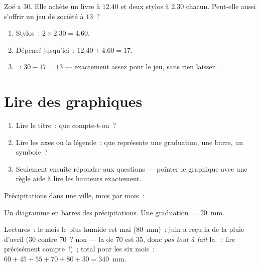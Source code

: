 \begin{example}\label{ex:g5:data:budget}
Zoé a $30$. Elle achète un livre à $12.40$ et deux stylos à
$2.30$ chacun. Peut-elle aussi s'offrir un jeu de société à
$13$~?
\begin{enumerate}
  \item Stylos~: $2 \times 2.30 = 4.60$.
  \item Dépensé jusqu'ici~: $12.40 + 4.60 = 17$.
  \item {}~: $30 - 17 = 13$ --- exactement assez pour le jeu,
        sans rien laisser.
\end{enumerate}
\end{example}

\section{Lire des graphiques}

\begin{method}\label{met:g5:data:read}
\begin{enumerate}
  \item Lire le titre~: que compte-t-on~?
  \item Lire les axes ou la légende~: que représente une
        graduation, une barre, un symbole~?
  \item Seulement ensuite répondre aux questions --- pointer le
        graphique avec une règle aide à lire les hauteurs
        exactement.
\end{enumerate}
\end{method}

\begin{example}\label{ex:g5:data:chart}
Précipitations dans une ville, mois par mois~:

\begin{omfigure}

{\small Un diagramme en barres des précipitations. Une graduation
$= 20$~mm.}
\end{omfigure}

Lectures~: le mois le plus humide est mai ($80$~mm)~; juin a reçu
la  de la pluie d'avril ($30$ contre $70$~? non --- la 
de $70$ est $35$, donc \emph{pas tout à fait} la ~: lire
précisément compte~!)~; total pour les six mois~:
$60 + 45 + 55 + 70 + 80 + 30 = 340$~mm.
\end{example}

